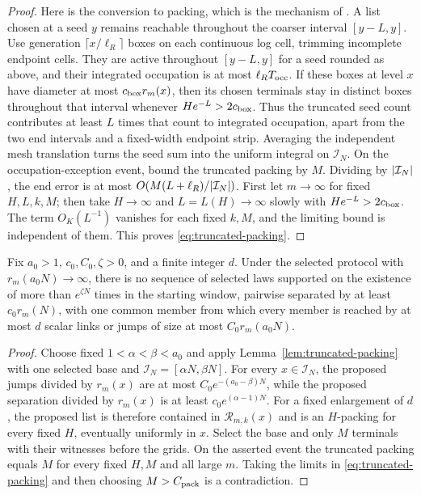 \begin{proof}
Here is the conversion to packing, which is the mechanism of
\cite[Lemma~11.4]{P}.  A list chosen at a seed \(y\) remains
reachable throughout the coarser interval \([y-L,y]\).
Use generation \(\lceil x/\ell_R\rceil\) boxes on each continuous
log cell, trimming incomplete endpoint cells.  They are active
throughout \([y-L,y]\) for a seed rounded as above, and their
integrated occupation is at most \(\ell_R T_{\rm occ}\).
If these boxes at level \(x\) have diameter at most
\(c_{\rm box}r_m(x)\), then its chosen terminals stay in distinct
boxes throughout that interval whenever
\(H e^{-L}>2c_{\rm box}\).  Thus the truncated seed count
contributes at least \(L\) times that count to integrated
occupation, apart from the two end intervals and a fixed-width
endpoint strip.  Averaging the
independent mesh translation turns the seed sum into the uniform
integral on \(\mathcal I_N\).  On the occupation-exception event,
bound the truncated packing by \(M\).  Dividing by
\(\lvert \mathcal I_N\rvert\), the end error is at most
\(O(M(L+\ell_R)/\lvert \mathcal I_N\rvert)\).  First let \(m\to\infty\) for fixed
\(H,L,k,M\); then take \(H\to\infty\) and
\(L=L(H)\to\infty\) slowly with \(He^{-L}>2c_{\rm box}\).
The term \(O_K(L^{-1})\) vanishes for each fixed \(k,M\), and
the limiting bound is independent of them.  This proves
\eqref{eq:truncated-packing}.
\end{proof}

\begin{lemma}
\label{lem:reachable-packing}
Fix \(a_0>1\), \(c_0,C_0,\zeta>0\), and a finite integer \(d\).
Under the selected protocol with \(r_m(a_0N)\to\infty\), there
is no sequence of selected laws supported on the existence of
more than \(e^{\zeta N}\) times in the starting window, pairwise
separated by at least \(c_0r_m(N)\), with one common member from
which every member is reached by at most \(d\) scalar links or jumps of size at most
\(C_0r_m(a_0N)\).
\end{lemma}

\begin{proof}
Choose fixed \(1<\alpha<\beta<a_0\) and apply
Lemma~\ref{lem:truncated-packing} with one selected base and
\(\mathcal I_N=[\alpha N,\beta N]\).  For every \(x\in\mathcal I_N\),
the proposed jumps divided by \(r_m(x)\) are at most
\(C_0e^{-(a_0-\beta)N}\), while the proposed separation divided
by \(r_m(x)\) is at least \(c_0e^{(\alpha-1)N}\).  For a fixed
enlargement of \(d\), the proposed list is therefore contained
in \(\mathcal R_{m,k}(x)\) and is an \(H\)-packing for every
fixed \(H\), eventually uniformly in \(x\).  Select the base
and only \(M\) terminals with their witnesses before the grids.
On the asserted event the truncated packing equals \(M\) for
every fixed \(H,M\) and all large \(m\).  Taking the limits in
\eqref{eq:truncated-packing} and then choosing
\(M>C_{\rm pack}\) is a contradiction.
\end{proof}

